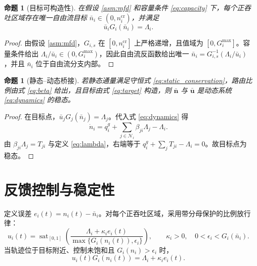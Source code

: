 \documentclass[a4paper,12pt]{article}
\theoremstyle{plain}
\newtheorem{proposition}[theorem]{命题}
\theoremstyle{definition}
\theoremstyle{remark}
\begin{document}
\begin{proposition}[目标可构造性]\label{prop:target}
在假设 \ref{asm:mfd} 和容量条件 \eqref{eq:capacity} 下，每个正吞吐区域存在唯一自由流目标 $\bar n_i\in(0,n_i^{\mathrm{cr}})$，并满足
\begin{equation}\label{eq:target_balance}
    \bar u_iG_i(\bar n_i)=\Lambda_i.
\end{equation}
\end{proposition}

\begin{proof}
由假设 \ref{asm:mfd}，$G_{i,s}$ 在 $[0,n_i^{\mathrm{cr}}]$ 上严格递增，且值域为 $[0,G_i^{\max}]$。容量条件给出 $\Lambda_i/\bar u_i\in(0,G_i^{\max})$，因此自由流反函数给出唯一 $\bar n_i=G_{i,s}^{-1}(\Lambda_i/\bar u_i)$，并且 $\bar n_i$ 位于自由流分支内部。
\end{proof}

\begin{proposition}[静态--动态桥接]\label{prop:bridge}
若静态通量满足守恒式 \eqref{eq:static_conservation}，路由比例由式 \eqref{eq:beta} 给出，且目标由式 \eqref{eq:target} 构造，则 $\bar{\bm n}$ 与 $\bar{\bm u}$ 是动态系统 \eqref{eq:dynamics} 的稳态。
\end{proposition}

\begin{proof}
在目标点，$\bar u_jG_j(\bar n_j)=\Lambda_j$。代入式 \eqref{eq:dynamics} 得
\begin{equation}
    \dot n_i
    =
    q_i^g+\sum_{j\in\mathcal N_i}\beta_{ji}\Lambda_j-\Lambda_i.
\end{equation}
由 $\beta_{ji}\Lambda_j=T_{ji}$ 与定义 \eqref{eq:lambda}，右端等于 $q_i^g+\sum_jT_{ji}-\Lambda_i=0$。故目标点为稳态。
\end{proof}

\section{反馈控制与稳定性}

定义误差 $e_i(t)=n_i(t)-\bar n_i$。对每个正吞吐区域，采用带分母保护的比例放行律：
\begin{equation}\label{eq:controller}
    u_i(t)
    =
    \operatorname{sat}_{[0,1]}
    \left(
    \frac{\Lambda_i+\kappa_i e_i(t)}
    {\max\{G_i(n_i(t)),\epsilon_i\}}
    \right),
    \qquad
    \kappa_i>0,\quad 0<\epsilon_i<G_i(\bar n_i).
\end{equation}
当轨迹位于目标附近、控制未饱和且 $G_i(n_i)>\epsilon_i$ 时，
\begin{equation}\label{eq:controlled_outflow}
    u_i(t)G_i(n_i(t))=\Lambda_i+\kappa_i e_i(t).
\end{equation}
\end{document}
